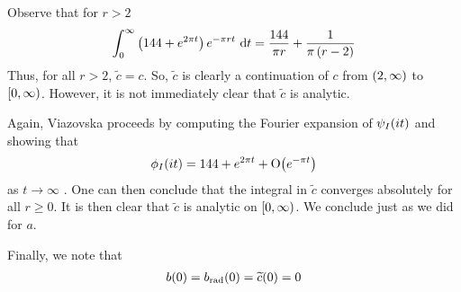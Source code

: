Observe that for $r > 2$
\begin{align*}
    \int_{0}^{\infty} \left( 144 + e^{2 \pi t} \right) e^{-\pi r t} \, \operatorname{d}\!{t}
    = \frac{144}{\pi r} + \frac{1}{\pi\left( r - 2 \right)}
\end{align*}
Thus, for all $r > 2$, $\tilde{c} = c$. So, $\tilde{c}$ is clearly a continuation of $c$ from $\left( 2, \infty \right)$ to $\left[0, \infty\right)$. However, it is not immediately clear that $\tilde{c}$ is analytic.

Again, Viazovska proceeds by computing the Fourier expansion of $\psi_I\!\left( it \right)$ and showing that
\begin{align*}
    \phi_I\!\left( it \right) =
    144 + e^{2\pi t} + \operatorname{O}\!\left( e^{- \pi t} \right)
\end{align*}
as $t \to \infty$ \cite[(39)]{Viazovska8}. One can then conclude that the integral in $\tilde{c}$ converges absolutely for all $r \geq 0$. It is then clear that $\tilde{c}$ is analytic on $\left[0, \infty\right)$. We conclude just as we did for $a$.

Finally, we note that
\begin{align*}
    b\!\left( 0 \right) = b_{\operatorname{rad}}\!\left( 0 \right) = \widetilde{c}\!\left( 0 \right) = 0
\end{align*}